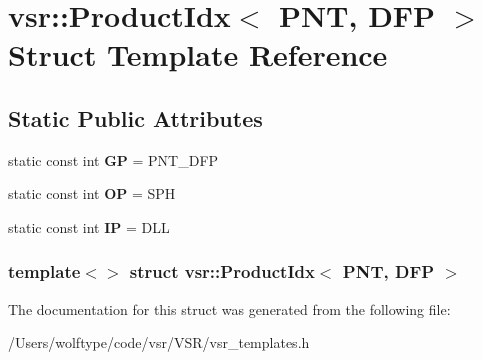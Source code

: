 \hypertarget{structvsr_1_1_product_idx_3_01_p_n_t_00_01_d_f_p_01_4}{\section{vsr\-:\-:Product\-Idx$<$ P\-N\-T, D\-F\-P $>$ Struct Template Reference}
\label{structvsr_1_1_product_idx_3_01_p_n_t_00_01_d_f_p_01_4}
}
\subsection*{Static Public Attributes}
\begin{DoxyCompactItemize}
\item 
\hypertarget{structvsr_1_1_product_idx_3_01_p_n_t_00_01_d_f_p_01_4_a92c7025dfb0e76275d61d36d0066864f}{static const int {\bfseries G\-P} = P\-N\-T\-\_\-\-D\-F\-P}\label{structvsr_1_1_product_idx_3_01_p_n_t_00_01_d_f_p_01_4_a92c7025dfb0e76275d61d36d0066864f}

\item 
\hypertarget{structvsr_1_1_product_idx_3_01_p_n_t_00_01_d_f_p_01_4_a65e956eb6bf3328124378abbb720f746}{static const int {\bfseries O\-P} = S\-P\-H}\label{structvsr_1_1_product_idx_3_01_p_n_t_00_01_d_f_p_01_4_a65e956eb6bf3328124378abbb720f746}

\item 
\hypertarget{structvsr_1_1_product_idx_3_01_p_n_t_00_01_d_f_p_01_4_ab462b99c64266bbf4c3d045117ced732}{static const int {\bfseries I\-P} = D\-L\-L}\label{structvsr_1_1_product_idx_3_01_p_n_t_00_01_d_f_p_01_4_ab462b99c64266bbf4c3d045117ced732}

\end{DoxyCompactItemize}
\subsubsection*{template$<$$>$ struct vsr\-::\-Product\-Idx$<$ P\-N\-T, D\-F\-P $>$}



The documentation for this struct was generated from the following file\-:\begin{DoxyCompactItemize}
\item 
/\-Users/wolftype/code/vsr/\-V\-S\-R/vsr\-\_\-templates.\-h\end{DoxyCompactItemize}
